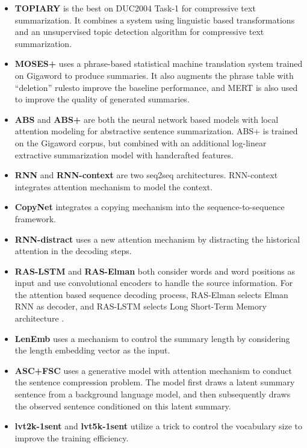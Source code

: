 \documentclass[11pt,letterpaper]{article}
\begin{document}
\begin{itemize}
	
	\item \textbf{TOPIARY} \cite{zajic2004bbn} is the best on DUC2004 Task-1 for compressive text summarization.
	It combines a system using linguistic based transformations and an unsupervised topic detection algorithm for compressive text summarization.
	
	\item \textbf{MOSES+} \cite{rush2015neural} uses a phrase-based statistical machine translation system trained on Gigaword to produce summaries.
	It also augments the phrase table with ``deletion'' rulesto improve the baseline performance, and MERT is also used to improve the quality of generated summaries.
	
	\item \textbf{ABS} and \textbf{ABS+} \cite{rush2015neural} are both the neural network based models with local attention modeling for abstractive sentence summarization.
	ABS+ is trained on the Gigaword corpus, but combined with an additional log-linear extractive summarization model with handcrafted features.
	
	\item \textbf{RNN} and \textbf{RNN-context} \cite{hu2015lcsts} are two seq2seq architectures. RNN-context integrates attention mechanism to model the context.
	
	\item \textbf{CopyNet} \cite{gu2016incorporating} integrates a copying mechanism into the sequence-to-sequence framework.
	
	\item \textbf{RNN-distract} \cite{chen2016distraction} uses a new attention mechanism by distracting the historical attention in the decoding steps.
	
	\item \textbf{RAS-LSTM} and \textbf{RAS-Elman} \cite{chopra2016abstractive} both consider words and word positions as input and use convolutional encoders to handle the source information.
	For the attention based sequence decoding process, RAS-Elman selects Elman RNN \cite{elman1990finding} as decoder, and RAS-LSTM selects Long Short-Term Memory architecture \cite{hochreiter1997long}.
	
	\item \textbf{LenEmb} \cite{kikuchi2016controlling} uses a mechanism to control the summary length by considering the length embedding vector as the input.
	
	\item \textbf{ASC+FSC} \cite{miao2016language} uses a generative model with attention mechanism to conduct the sentence compression problem.
	The model first draws a latent summary sentence from a background language model, and then subsequently draws the observed sentence conditioned on this latent summary.
	
	\item \textbf{lvt2k-1sent} and \textbf{lvt5k-1sent} \cite{nallapati2016abstractive} utilize a trick to control the vocabulary size to improve the training efficiency.
	
	
\end{itemize}
\end{document}
